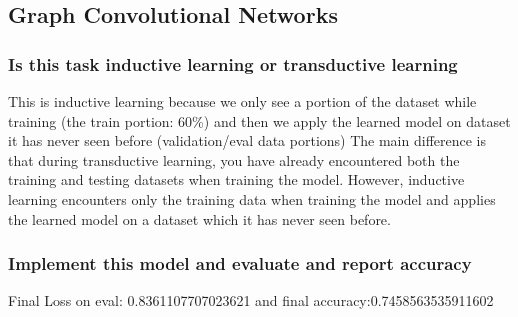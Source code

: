 \documentclass[11pt]{article}
\begin{document}
\subsection{Graph Convolutional Networks}
\subsubsection{Is this task inductive learning or transductive learning}
This is inductive learning because we only see a portion of the dataset while training (the train portion: 60\%) and then we apply the learned model on dataset it has never seen before (validation/eval data portions)
The main difference is that during transductive learning, you have already encountered both the training and testing datasets when training the model. However, inductive learning encounters only the training data when training the model and applies the learned model on a dataset which it has never seen before.
\subsubsection{Implement this model and evaluate and report accuracy}
Final Loss on eval: 0.8361107707023621 and final accuracy:0.7458563535911602
\end{document}
